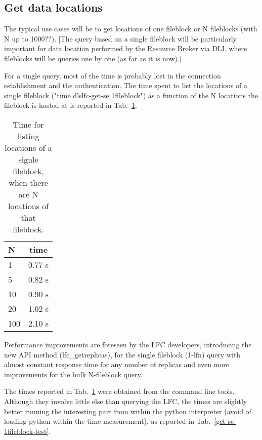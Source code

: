 \documentclass[pdftex]{cmspaper}
\begin{document}
\subsection {Get data locations}

The typical use cases will be to get locations of one fileblock or N fileblocks (with N up to 1000??).
[The query based on a single fileblock will be particularly important for data location performed by the Resource Broker via DLI, where fileblocks will be queries one by one (as far as it is now).]

For a single query, most of the time is probably lost in the connection 
establishment and the authentication. 
The time spent to list the locations of a single fileblock ("time dlslfc-get-se 1fileblock") 
as a function of the N locations the fileblock is hosted at is reported in Tab.~\ref{get-se-1fileblock}.

\begin{table}[!htbp]
\begin{center}
 \begin{tabular}{|l|c|}         \hline
   N  & time \\ \hline
   1  & 0.77 s \\ \hline
   5  & 0.82 s  \\ \hline
   10 & 0.90 s \\ \hline
   20 & 1.02 s \\ \hline
  100 & 2.10 s \\ \hline
\end{tabular}
\caption {Time for listing locations of a signle fileblock, when there are N locations of that fileblock. }\label{get-se-1fileblock}
\end{center}
\end{table}

Performance improvements are foreseen by the LFC developers, introducing
the new API method (lfc\_getreplicas), for the single fileblock (1-lfn) query
with  almost constant response time for any number of replicas and even more improvements 
for the bulk N-fileblock query.


The times reported in Tab.~\ref{get-se-1fileblock} were obtained from the command line tools. 
Although they involve little else than querying the LFC, the times are slightly better 
running the interesting part from within the python interpreter (avoid of loading python within 
the time measurement), as reported in Tab.~\ref{get-se-1fileblock-test}.
\end{document}
